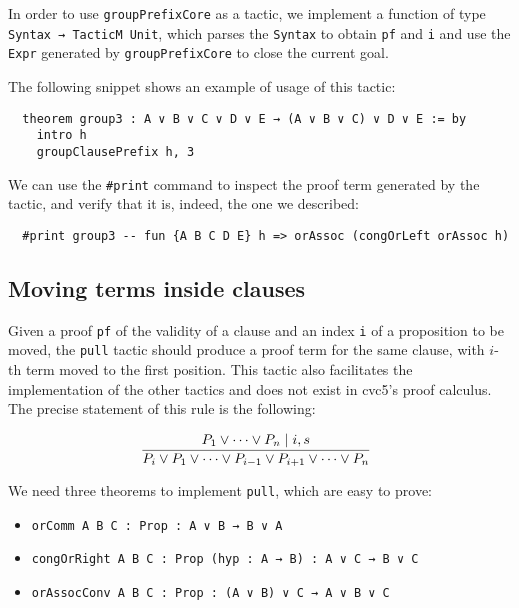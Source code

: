 In order to use \texttt{groupPrefixCore} as a tactic, we implement
a function of type \texttt{Syntax → TacticM Unit}, which parses the \texttt{Syntax}
to obtain \texttt{pf} and \texttt{i} and use the \texttt{Expr} generated by
\texttt{groupPrefixCore} to close the current goal.

The following snippet shows an example of usage of this tactic:

\newpage

\begin{verbatim}
  theorem group3 : A ∨ B ∨ C ∨ D ∨ E → (A ∨ B ∨ C) ∨ D ∨ E := by
    intro h
    groupClausePrefix h, 3
\end{verbatim}

We can use the \texttt{\#print} command to inspect the proof term generated by the tactic, and
verify that it is, indeed, the one we described:

\begin{verbatim}
  #print group3 -- fun {A B C D E} h => orAssoc (congOrLeft orAssoc h)
\end{verbatim}

\subsection{Moving terms inside clauses}

Given a proof \texttt{pf} of the validity of a clause and an index \texttt{i} of a proposition to be moved, the \texttt{pull} tactic should produce a proof term for the same clause,
with $i$-th term moved to the first position. This tactic also facilitates the implementation
of the other tactics and does not exist in cvc5's proof calculus. The precise
statement of this rule is the following:

\[
  \infer[]{P_{i} \vee P_{1} \vee \cdots \vee P_{i - 1} \vee P_{i + 1} \vee \cdots \vee P_{n}}{P_{1} \vee \cdots \vee P_{n}  \mid i, s}
\]


We need three theorems to implement \texttt{pull}, which are easy to prove:

\begin{itemize}
  \item \texttt{orComm {A B C : Prop} : A ∨ B → B ∨ A}
  \item \texttt{congOrRight {A B C : Prop} (hyp : A → B) : A ∨ C → B ∨ C}
  \item \texttt{orAssocConv {A B C : Prop} : (A ∨ B) ∨ C → A ∨ B ∨ C}
\end{itemize}


